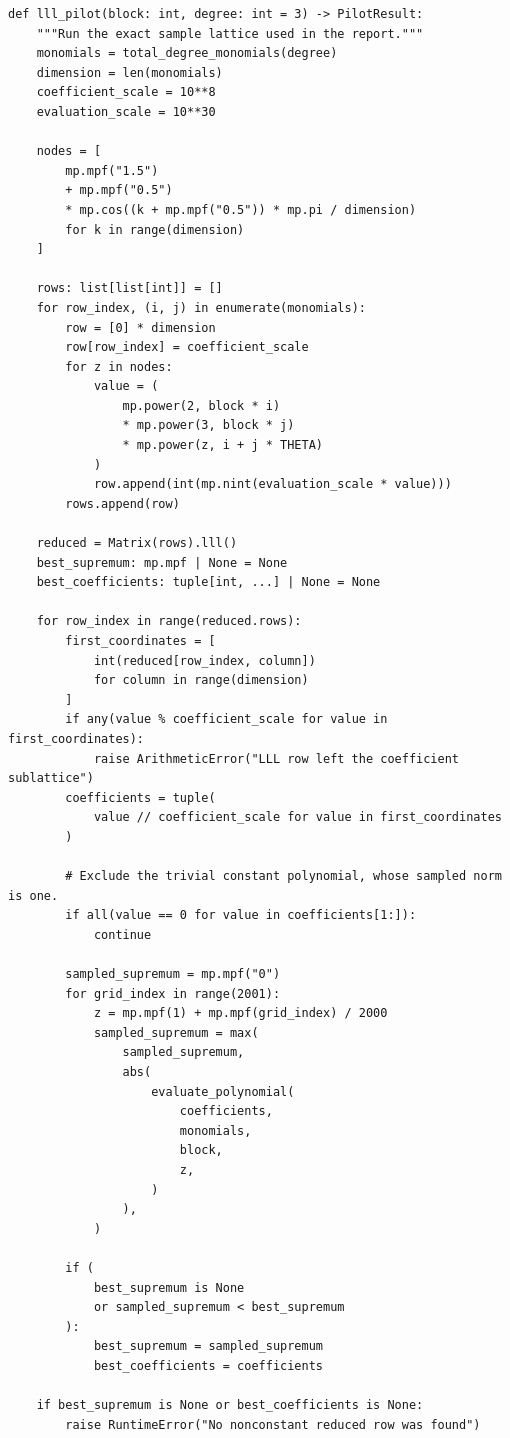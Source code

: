 \documentclass[11pt,oneside]{article}
\theoremstyle{definition}
\theoremstyle{remark}
\begin{document}
\begin{lstlisting}[style=pythonstyle,caption={Reproduction of the numerical tables and the degree-three LLL pilot.}]
def lll_pilot(block: int, degree: int = 3) -> PilotResult:
    """Run the exact sample lattice used in the report."""
    monomials = total_degree_monomials(degree)
    dimension = len(monomials)
    coefficient_scale = 10**8
    evaluation_scale = 10**30

    nodes = [
        mp.mpf("1.5")
        + mp.mpf("0.5")
        * mp.cos((k + mp.mpf("0.5")) * mp.pi / dimension)
        for k in range(dimension)
    ]

    rows: list[list[int]] = []
    for row_index, (i, j) in enumerate(monomials):
        row = [0] * dimension
        row[row_index] = coefficient_scale
        for z in nodes:
            value = (
                mp.power(2, block * i)
                * mp.power(3, block * j)
                * mp.power(z, i + j * THETA)
            )
            row.append(int(mp.nint(evaluation_scale * value)))
        rows.append(row)

    reduced = Matrix(rows).lll()
    best_supremum: mp.mpf | None = None
    best_coefficients: tuple[int, ...] | None = None

    for row_index in range(reduced.rows):
        first_coordinates = [
            int(reduced[row_index, column])
            for column in range(dimension)
        ]
        if any(value % coefficient_scale for value in first_coordinates):
            raise ArithmeticError("LLL row left the coefficient sublattice")
        coefficients = tuple(
            value // coefficient_scale for value in first_coordinates
        )

        # Exclude the trivial constant polynomial, whose sampled norm is one.
        if all(value == 0 for value in coefficients[1:]):
            continue

        sampled_supremum = mp.mpf("0")
        for grid_index in range(2001):
            z = mp.mpf(1) + mp.mpf(grid_index) / 2000
            sampled_supremum = max(
                sampled_supremum,
                abs(
                    evaluate_polynomial(
                        coefficients,
                        monomials,
                        block,
                        z,
                    )
                ),
            )

        if (
            best_supremum is None
            or sampled_supremum < best_supremum
        ):
            best_supremum = sampled_supremum
            best_coefficients = coefficients

    if best_supremum is None or best_coefficients is None:
        raise RuntimeError("No nonconstant reduced row was found")


\end{lstlisting}
\end{document}
